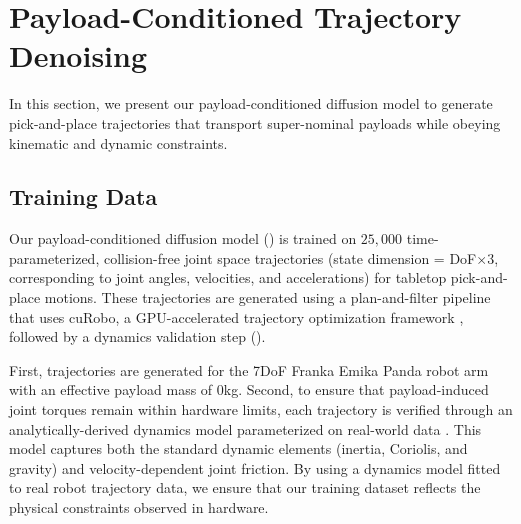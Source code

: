 \section{Payload-Conditioned Trajectory Denoising}

In this section, we present our payload-conditioned diffusion model to generate pick-and-place trajectories that transport super-nominal payloads while obeying kinematic and dynamic constraints.

\subsection{Training Data}

Our payload-conditioned diffusion model () is trained on $25,000$ time-parameterized, collision-free joint space trajectories (state dimension = DoF$\times3$, corresponding to joint angles, velocities, and accelerations) for tabletop pick-and-place motions. These trajectories are generated using a plan-and-filter pipeline that uses cuRobo, a GPU-accelerated trajectory optimization framework \cite{sundaralingam2023curobo}, followed by a dynamics validation step ().

First, trajectories are generated for the 7DoF Franka Emika Panda robot arm with an effective payload mass of $0$kg.
Second, to ensure that payload-induced joint torques remain within hardware limits, each trajectory is verified through an analytically-derived dynamics model parameterized on real-world data \cite{gaz2019dynamic}.
This model captures both the standard dynamic elements (inertia, Coriolis, and gravity) and velocity-dependent joint friction.
By using a dynamics model fitted to real robot trajectory data, we ensure that our training dataset reflects the physical constraints observed in hardware.

